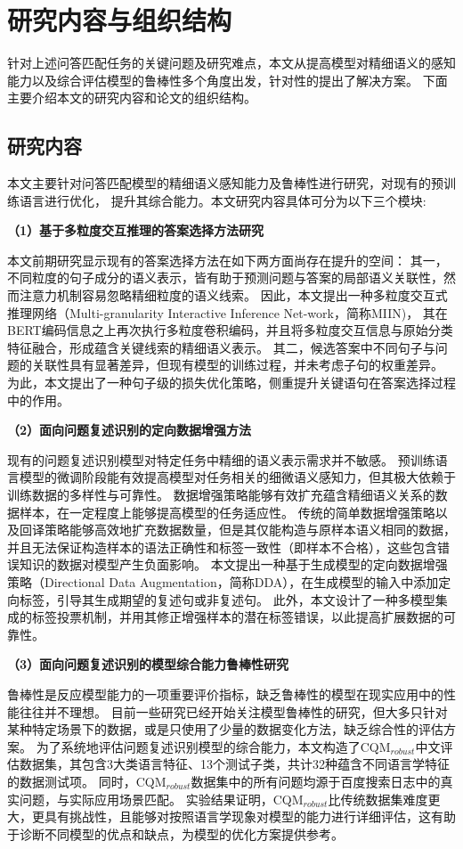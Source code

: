 \section{研究内容与组织结构}

针对上述问答匹配任务的关键问题及研究难点，本文从提高模型对精细语义的感知能力以及综合评估模型的鲁棒性多个角度出发，针对性的提出了解决方案。
下面主要介绍本文的研究内容和论文的组织结构。

\subsection{研究内容}

本文主要针对问答匹配模型的精细语义感知能力及鲁棒性进行研究，对现有的预训练语言进行优化，
提升其综合能力。本文研究内容具体可分为以下三个模块:

\textbf{\songti （1）基于多粒度交互推理的答案选择方法研究}

本文前期研究显示现有的答案选择方法在如下两方面尚存在提升的空间：
其一，不同粒度的句子成分的语义表示，皆有助于预测问题与答案的局部语义关联性，然而注意力机制容易忽略精细粒度的语义线索。
因此，本文提出一种多粒度交互式推理网络（Multi-granularity Interactive Inference Net-work，简称MIIN)，
其在BERT编码信息之上再次执行多粒度卷积编码，并且将多粒度交互信息与原始分类特征融合，形成蕴含关键线索的精细语义表示。
其二，候选答案中不同句子与问题的关联性具有显著差异，但现有模型的训练过程，并未考虑子句的权重差异。
为此，本文提出了一种句子级的损失优化策略，侧重提升关键语句在答案选择过程中的作用。

\textbf{\songti （2）面向问题复述识别的定向数据增强方法}

现有的问题复述识别模型对特定任务中精细的语义表示需求并不敏感。
预训练语言模型的微调阶段能有效提高模型对任务相关的细微语义感知力，但其极大依赖于训练数据的多样性与可靠性。
数据增强策略能够有效扩充蕴含精细语义关系的数据样本，在一定程度上能够提高模型的任务适应性。
传统的简单数据增强策略以及回译策略能够高效地扩充数据数量，但是其仅能构造与原样本语义相同的数据，并且无法保证构造样本的语法正确性和标签一致性（即样本不合格），这些包含错误知识的数据对模型产生负面影响。
本文提出一种基于生成模型的定向数据增强策略（Directional Data Augmentation，简称DDA），在生成模型的输入中添加定向标签，引导其生成期望的复述句或非复述句。
此外，本文设计了一种多模型集成的标签投票机制，并用其修正增强样本的潜在标签错误，以此提高扩展数据的可靠性。

\textbf{\songti （3）面向问题复述识别的模型综合能力鲁棒性研究}

鲁棒性是反应模型能力的一项重要评价指标，缺乏鲁棒性的模型在现实应用中的性能往往并不理想。
目前一些研究已经开始关注模型鲁棒性的研究，但大多只针对某种特定场景下的数据，或是只使用了少量的数据变化方法，缺乏综合性的评估方案。
为了系统地评估问题复述识别模型的综合能力，本文构造了CQM$_{robust}$中文评估数据集，其包含3大类语言特征、13个测试子类，共计32种蕴含不同语言学特征的数据测试项。
同时，CQM$_{robust}$数据集中的所有问题均源于百度搜索日志中的真实问题，与实际应用场景匹配。
实验结果证明，CQM$_{robust}$比传统数据集难度更大，更具有挑战性，且能够对按照语言学现象对模型的能力进行详细评估，这有助于诊断不同模型的优点和缺点，为模型的优化方案提供参考。


